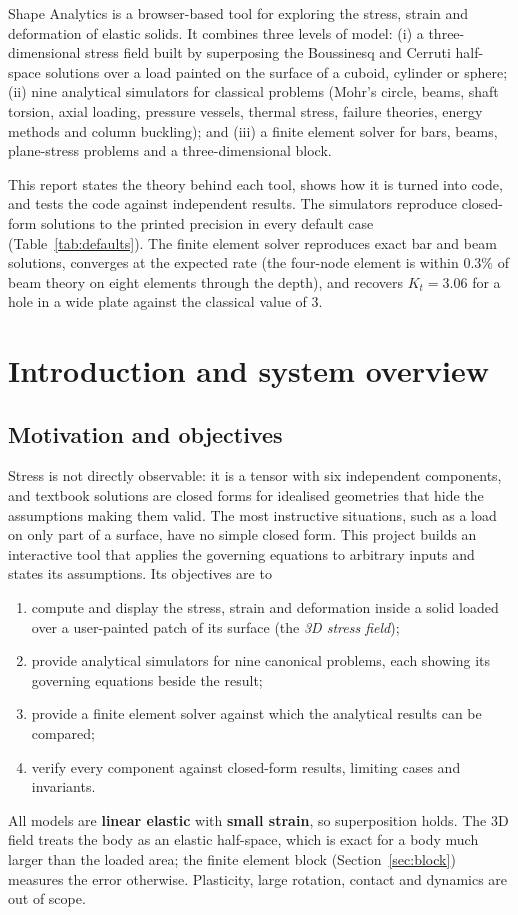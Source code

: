 Shape Analytics is a browser-based tool for exploring the stress, strain and deformation of elastic solids. It combines three levels of model: (i) a three-dimensional stress field built by superposing the Boussinesq and Cerruti half-space solutions over a load painted on the surface of a cuboid, cylinder or sphere; (ii) nine analytical simulators for classical problems (Mohr's circle, beams, shaft torsion, axial loading, pressure vessels, thermal stress, failure theories, energy methods and column buckling); and (iii) a finite element solver for bars, beams, plane-stress problems and a three-dimensional block.

This report states the theory behind each tool, shows how it is turned into code, and tests the code against independent results. The simulators reproduce closed-form solutions to the printed precision in every default case (Table~\ref{tab:defaults}). The finite element solver reproduces exact bar and beam solutions, converges at the expected rate (the four-node element is within $0.3\%$ of beam theory on eight elements through the depth), and recovers $K_t=3.06$ for a hole in a wide plate against the classical value of $3$.

\tableofcontents
\clearpage{}
\chapter{Introduction and system overview}
\label{ch:intro}

\section{Motivation and objectives}
Stress is not directly observable: it is a tensor with six independent components, and textbook solutions are closed forms for idealised geometries that hide the assumptions making them valid. The most instructive situations, such as a load on only part of a surface, have no simple closed form. This project builds an interactive tool that applies the governing equations to arbitrary inputs and states its assumptions. Its objectives are to
\begin{enumerate}[nosep]
\item compute and display the stress, strain and deformation inside a solid loaded over a user-painted patch of its surface (the \emph{3D stress field});
\item provide analytical simulators for nine canonical problems, each showing its governing equations beside the result;
\item provide a finite element solver against which the analytical results can be compared;
\item verify every component against closed-form results, limiting cases and invariants.
\end{enumerate}
All models are \textbf{linear elastic} with \textbf{small strain}, so superposition holds. The 3D field treats the body as an elastic half-space, which is exact for a body much larger than the loaded area; the finite element block (Section~\ref{sec:block}) measures the error otherwise. Plasticity, large rotation, contact and dynamics are out of scope.

